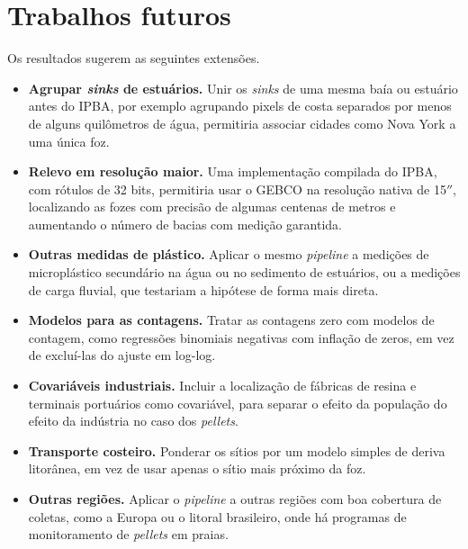 \section{Trabalhos futuros}

Os resultados sugerem as seguintes extensões.

\begin{itemize}
	\item \textbf{Agrupar \textit{sinks} de estuários.} Unir os \textit{sinks} de uma mesma baía ou estuário antes do IPBA, por exemplo agrupando pixels de costa separados por menos de alguns quilômetros de água, permitiria associar cidades como Nova York a uma única foz.
	\item \textbf{Relevo em resolução maior.} Uma implementação compilada do IPBA, com rótulos de 32 bits, permitiria usar o GEBCO na resolução nativa de 15$''$, localizando as fozes com precisão de algumas centenas de metros e aumentando o número de bacias com medição garantida.
	\item \textbf{Outras medidas de plástico.} Aplicar o mesmo \textit{pipeline} a medições de microplástico secundário na água ou no sedimento de estuários, ou a medições de carga fluvial, que testariam a hipótese de forma mais direta.
	\item \textbf{Modelos para as contagens.} Tratar as contagens zero com modelos de contagem, como regressões binomiais negativas com inflação de zeros, em vez de excluí-las do ajuste em log-log.
	\item \textbf{Covariáveis industriais.} Incluir a localização de fábricas de resina e terminais portuários como covariável, para separar o efeito da população do efeito da indústria no caso dos \textit{pellets}.
	\item \textbf{Transporte costeiro.} Ponderar os sítios por um modelo simples de deriva litorânea, em vez de usar apenas o sítio mais próximo da foz.
	\item \textbf{Outras regiões.} Aplicar o \textit{pipeline} a outras regiões com boa cobertura de coletas, como a Europa ou o litoral brasileiro, onde há programas de monitoramento de \textit{pellets} em praias.
\end{itemize}
